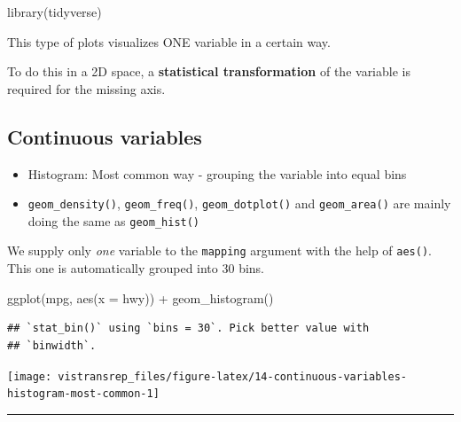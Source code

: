 \documentclass[]{book}
\newenvironment{Shaded}{}{}
\newcommand{\DataTypeTok}[1]{#1}
\newcommand{\KeywordTok}[1]{\textcolor[rgb]{0.00,0.00,1.00}{#1}}
\newcommand{\NormalTok}[1]{#1}
\newcommand{\OperatorTok}[1]{#1}
\newcommand{\StringTok}[1]{\textcolor[rgb]{0.00,0.50,0.50}{#1}}
\begin{document}
\begin{Shaded}
\begin{Highlighting}[]
\KeywordTok{library}\NormalTok{(tidyverse)}
\end{Highlighting}
\end{Shaded}

This type of plots visualizes ONE variable in a certain way.

To do this in a 2D space, a \textbf{statistical transformation} of the variable is required for the missing axis.

\hypertarget{continuous-variables}{%
\subsection{Continuous variables}\label{continuous-variables}}

\begin{itemize}
\item
  Histogram: Most common way - grouping the variable into equal bins
\item
  \texttt{geom\_density()}, \texttt{geom\_freq()}, \texttt{geom\_dotplot()} and \texttt{geom\_area()} are mainly doing the same as \texttt{geom\_hist()}
\end{itemize}

We supply only \emph{one} variable to the \texttt{mapping} argument with the help of \texttt{aes()}.
This one is automatically grouped into 30 bins.

\begin{Shaded}
\begin{Highlighting}[]
\KeywordTok{ggplot}\NormalTok{(mpg, }\KeywordTok{aes}\NormalTok{(}\DataTypeTok{x =}\NormalTok{ hwy)) }\OperatorTok{+}
\StringTok{  }\KeywordTok{geom_histogram}\NormalTok{()}
\end{Highlighting}
\end{Shaded}

\begin{verbatim}
## `stat_bin()` using `bins = 30`. Pick better value with
## `binwidth`.
\end{verbatim}

\begin{flushright}\texttt{[image: vistransrep\_files/figure-latex/14-continuous-variables-histogram-most-common-1]} \end{flushright}

\begin{center}\rule{0.5\linewidth}{\linethickness}\end{center}
\end{document}
